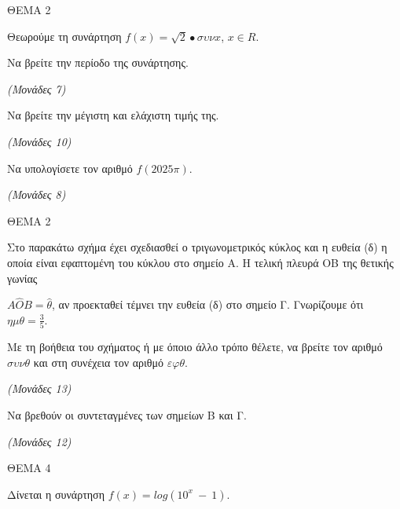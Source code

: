 \documentclass[11pt,a4paper,twoside]{book}
\newcommand{\monades}[1]{\hfill \textit{(Μονάδες #1)}}
\begin{document}
\vspace{4mm}

ΘΕΜΑ 2

Θεωρούμε τη συνάρτηση $f(x) = \sqrt{2} \bullet \sigma\upsilon\nu x$, $x \in R$.

\begin{alist}
\item

\end{alist}
\begin{alist}
\item
  Να βρείτε την περίοδο της συνάρτησης.

\monades{7}


\end{alist}
\begin{alist}
\item
  Να βρείτε την μέγιστη και ελάχιστη τιμής της.

\monades{10}

\item Να υπολογίσετε τον αριθμό $f(2025\pi)$.

\monades{8}
\end{alist}

\vspace{4mm}

ΘΕΜΑ 2

Στο παρακάτω σχήμα έχει σχεδιασθεί ο τριγωνομετρικός κύκλος και η ευθεία (δ) η οποία είναι εφαπτομένη του κύκλου στο σημείο Α. Η τελική πλευρά ΟΒ της θετικής γωνίας

$Α\widehat{Ο}Β = \widehat{\theta}$, αν προεκταθεί τέμνει την ευθεία (δ) στο σημείο Γ. Γνωρίζουμε ότι $\eta\mu\theta = \frac{3}{5}$.

\begin{alist}
\item Με τη βοήθεια του σχήματος ή με όποιο άλλο τρόπο θέλετε, να βρείτε τον αριθμό $\sigma\upsilon\nu\theta$ και στη συνέχεια τον αριθμό $\varepsilon\varphi\theta$.

\monades{13}

\item Να βρεθούν οι συντεταγμένες των σημείων Β και Γ.

\monades{12}
\end{alist}

\vspace{4mm}

ΘΕΜΑ 4

Δίνεται η συνάρτηση $f(x) = log(10^{x}\  - \ 1)$.
\end{document}
